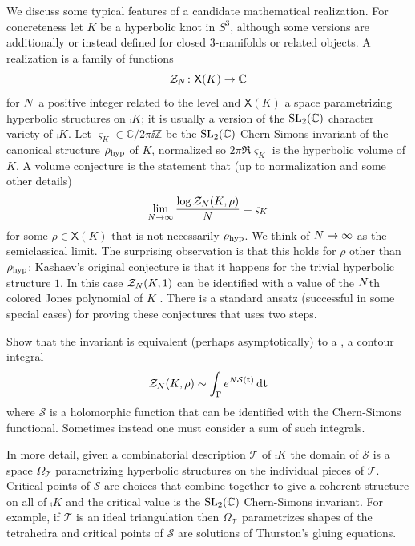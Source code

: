 \documentclass[margincite, leqno]{sl2art}
\numberwithin{equation}{section}
\begin{document}
We discuss some typical features of a candidate mathematical realization.%
For concreteness let \(K\) be a hyperbolic knot in \(S^{3}\),
although some versions are additionally or instead defined for closed
\(3\)-manifolds or related objects.
A realization is a family of functions
\[
  \mathcal{Z}_{N} \colon \mathsf{X}(K) \to \mathbb{C}
\]
for \(N\) a positive integer related to the level and
\(\mathsf{X}(K)\) a space parametrizing hyperbolic structures on
\(\comp{K}\); it is usually a version of the \(\operatorname{SL}_2(\mathbb{C})\) character
variety of \(\comp{K}\).
Let \(\varsigma_{K} \in \mathbb{C}/ 2 \pi \ii \mathbb{Z}\) be the
\(\operatorname{SL}_2(\mathbb{C})\) Chern-Simons invariant of the canonical structure
\(\rho_{\operatorname{hyp}}\) of \(K\), normalized so \(2 \pi \Re \varsigma_{K}\)
is the hyperbolic volume of \(K\).
A volume conjecture is the statement that (up to normalization and
some other details)
\begin{equation}
  \label{eq:asymptotics sign positive}
  \lim_{N \to \infty}
  \frac{
    \log \mathcal{Z}_{N}(K, \rho)
  }{
    N
  }
  =
  \varsigma_{K}
\end{equation}
for some \(\rho \in \mathsf{X}(K)\) that is not necessarily \(\rho_{\operatorname{hyp}}\).
We think of \(N \to \infty\) as the semiclassical limit.
The surprising observation is that this holds for \(\rho\) other than
\(\rho_{\operatorname{hyp}}\); Kashaev's original conjecture \cite{Kashaev1997} is
that it happens for the trivial hyperbolic structure \(1\).
In this case \(\mathcal{Z}_{N}(K,1)\) can be identified with a
value of the \(N\)th colored Jones polynomial of \(K\) \cite{Murakami2001}.
There is a standard ansatz (successful in some special cases) for
proving these conjectures that uses two steps.

\begin{step}
  \label{step 1}
  Show that the invariant is equivalent (perhaps asymptotically) to a
  , a contour integral
  \[
    \mathcal{Z}_{N}(K, \rho) \sim
    \int_{\Gamma} e^{N \mathcal{S}(\mathbf{t})} \,\mathrm{d} \mathbf{t}
  \]
  where \(\mathcal{S}\) is a holomorphic function that can be
  identified with the Chern-Simons functional.
  Sometimes instead one must consider a sum of such integrals.
\end{step}

In more detail, given a combinatorial description \(\mathcal{T}\) of
\(\comp{K}\) the domain of \(\mathcal{S}\) is a space
\(\Omega_{\mathcal{T}}\) parametrizing hyperbolic structures on the
individual pieces of \(\mathcal{T}\).
Critical points of \(\mathcal{S}\) are choices that combine together
to give a coherent structure on all of \(\comp{K}\) and the critical
value is the \(\operatorname{SL}_2(\mathbb{C})\) Chern-Simons invariant.
For example, if \(\mathcal{T}\) is an ideal triangulation then
\(\Omega_{\mathcal{T}}\) parametrizes shapes of the tetrahedra and
critical points of \(\mathcal{S}\) are solutions of Thurston's gluing equations.
\end{document}
